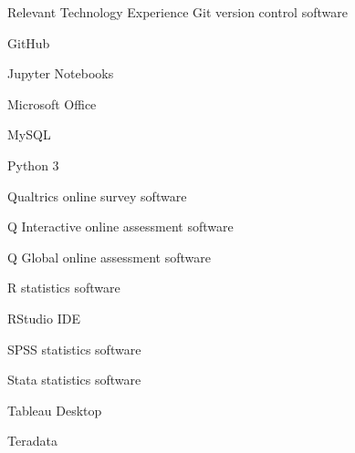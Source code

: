 \documentclass[
]{article}
\begin{document}
Relevant Technology Experience
Git version control software

GitHub

Jupyter Notebooks

Microsoft Office

MySQL

Python 3

Qualtrics online survey software

Q Interactive online assessment software

Q Global online assessment software

R statistics software

RStudio IDE

SPSS statistics software

Stata statistics software

Tableau Desktop

Teradata
\end{document}
